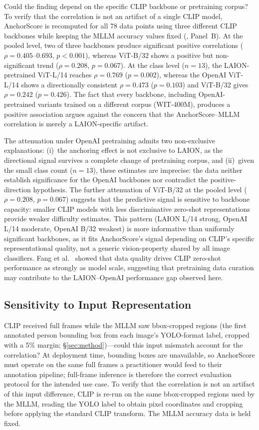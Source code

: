 \documentclass[a4paper,fleqn]{cas-sc}
\begin{document}
Could the finding depend on the specific CLIP backbone or pretraining corpus? To verify that the correlation is not an artifact of a single CLIP model, AnchorScore is recomputed for all 78 data points using three different CLIP backbones while keeping the MLLM accuracy values fixed (, Panel~B). At the pooled level, two of three backbones produce significant positive correlations ($\rho=0.405$--$0.693$, $p<0.001$), whereas ViT-B/32 shows a positive but non-significant trend ($\rho=0.208$, $p=0.067$). At the class level ($n=13$), the LAION-pretrained ViT-L/14 reaches $\rho=0.769$ ($p=0.002$), whereas the OpenAI ViT-L/14 shows a directionally consistent $\rho=0.473$ ($p=0.103$) and ViT-B/32 gives $\rho=0.242$ ($p=0.426$). The fact that every backbone, including OpenAI-pretrained variants trained on a different corpus (WIT-400M), produces a positive association argues against the concern that the AnchorScore--MLLM correlation is merely a LAION-specific artifact.

The attenuation under OpenAI pretraining admits two non-exclusive explanations: (i)~the anchoring effect is not exclusive to LAION, as the directional signal survives a complete change of pretraining corpus, and (ii)~given the small class count ($n=13$), these estimates are imprecise: the data neither establish significance for the OpenAI backbones nor contradict the positive-direction hypothesis. The further attenuation of ViT-B/32 at the pooled level ($\rho=0.208$, $p=0.067$) suggests that the predictive signal is sensitive to backbone capacity: smaller CLIP models with less discriminative zero-shot representations provide weaker difficulty estimates. This pattern (LAION L/14 strong, OpenAI L/14 moderate, OpenAI B/32 weakest) is more informative than uniformly significant backbones, as it fits AnchorScore's signal depending on CLIP's specific representational quality, not a generic vision-property shared by all image classifiers. Fang et al.~\cite{fang2024data} showed that data quality drives CLIP zero-shot performance as strongly as model scale, suggesting that pretraining data curation may contribute to the LAION--OpenAI performance gap observed here.



\subsection{Sensitivity to Input Representation}
\label{sec:input_repr}

CLIP received full frames while the MLLM saw bbox-cropped regions (the first annotated person bounding box from each image's YOLO-format label, cropped with a 5\% margin; \S\ref{sec:method})---could this input mismatch account for the correlation? At deployment time, bounding boxes are unavailable, so AnchorScore must operate on the same full frames a practitioner would feed to their annotation pipeline; full-frame inference is therefore the correct evaluation protocol for the intended use case. To verify that the correlation is not an artifact of this input difference, CLIP is re-run on the same bbox-cropped regions used by the MLLM, reading the YOLO label to obtain pixel coordinates and cropping before applying the standard CLIP transform. The MLLM accuracy data is held fixed.
\end{document}
